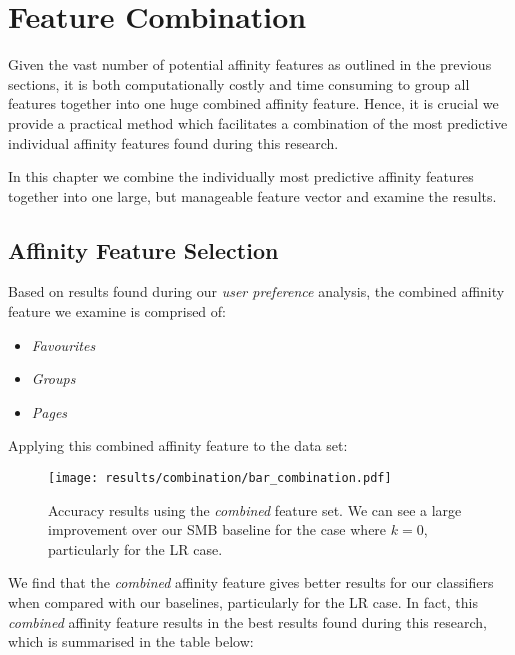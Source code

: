 
\chapter{Feature Combination}
\label{cha:bma}

Given the vast number of potential affinity features as outlined in the previous sections, it is both computationally costly and time 
consuming to group all features together into one huge combined affinity feature. Hence, it is crucial we provide a practical method which 
facilitates a combination of the most predictive individual affinity features found during this research.

In this chapter we combine the individually most predictive affinity features together into one large, but manageable feature vector 
and examine the results.

\section{Affinity Feature Selection}
\label{sec:notation}

Based on results found during our \emph{user preference} analysis, the combined affinity feature we examine is comprised of:
\begin{itemize}
\item \emph{Favourites}
\item \emph{Groups}
\item \emph{Pages}
\end{itemize}

\clearpage

Applying this combined affinity feature to the data set:

\begin{figure}[h]
	\begin{center}
		\texttt{[image: results/combination/bar\_combination.pdf]}
		\caption{Accuracy results using the \emph{combined} feature set. We can see a large improvement over our SMB baseline for the case
				 where $k=0$, particularly for the LR case.}
	\end{center}
\end{figure}

\clearpage

We find that the \emph{combined} affinity feature gives better results for our classifiers when compared with our baselines, particularly for 
the LR case. In fact, this \emph{combined} affinity feature results in the best results found during this research, which is summarised in 
the table below:

